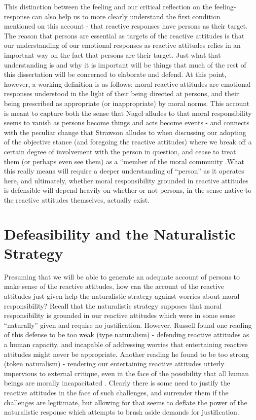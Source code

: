 \documentclass[phd,12pt,oneside,paper=letterpaper]{ubcthesis}
\begin{document}
This distinction between the feeling and our critical reflection on the feeling-response can also help us to more clearly understand the first condition mentioned on this account - that reactive responses have persons as their target. The reason that persons are essential as targets of the reactive attitudes is that our understanding of our emotional responses as reactive attitudes relies in an important way on the fact that persons are their target. Just what that understanding is and why it is important will be things that much of the rest of this dissertation will be concerned to elaborate and defend. At this point, however, a working definition is as follows: moral reactive attitudes are emotional responses understood in the light of their being directed at persons, and their being prescribed as appropriate (or inappropriate) by moral norms. This account is meant to capture both the sense that Nagel alludes to that moral responsibility seems to vanish as persons become things and acts become events - and connects with the peculiar change that Strawson alludes to when discussing our adopting of the objective stance (and foregoing the reactive attitudes) where we break off a certain degree of involvement with the person in question, and cease to treat them (or perhaps even see them) as a ``member of the moral community \citep[p.9]{strawsonp1974}.What this really means will require a deeper understanding of ``person'' as it operates here, and ultimately, whether moral responsibility grounded in reactive attitudes is defensible will depend heavily on whether or not persons, in the sense native to the reactive attitudes themselves, actually exist.

\section{Defeasibility and the Naturalistic Strategy}
Presuming that we will be able to generate an adequate account of persons to make sense of the reactive attitudes, how can the account of the reactive attitudes just given help the naturalistic strategy against worries about moral responsibility? Recall that the naturalistic strategy supposes that moral responsibility is grounded in our reactive attitudes which were in some sense ``naturally'' given and require no justification. However, Russell found one reading of this defense to be too weak (type naturalism) - defending reactive attitudes as a human capacity, and incapable of addressing worries that entertaining reactive attitudes might never be appropriate. Another reading he found to be too strong (token naturalism) - rendering our entertaining reactive attitudes utterly impervious to external critique, even in the face of the possibility that all human beings are morally incapacitated \citep[p.299]{russell1992}. Clearly there is some need to justify the reactive attitudes in the face of such challenges, and surrender them if the challenges are legitimate, but allowing for that seems to deflate the power of the naturalistic response which attempts to brush aside demands for justification.
\end{document}
